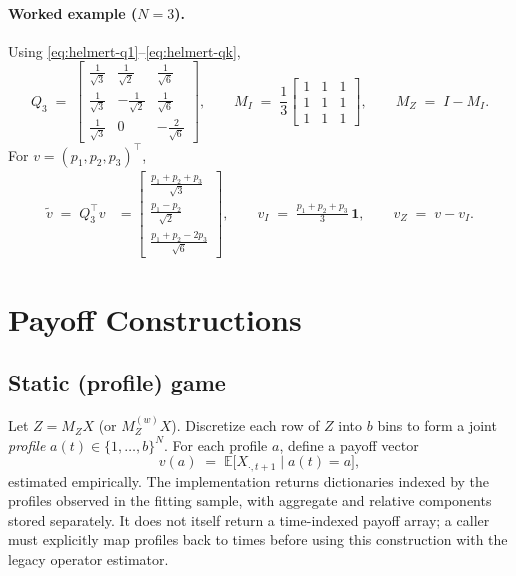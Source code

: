 \documentclass[11pt]{article}
\newcommand{\one}{\mathbf{1}}
\newcommand{\E}{\mathbb{E}}
\begin{document}
\paragraph{Worked example ($N=3$).}
Using \eqref{eq:helmert-q1}–\eqref{eq:helmert-qk},
\begin{equation}
Q_3 \;=\;
\begin{bmatrix}
\frac{1}{\sqrt{3}} & \frac{1}{\sqrt{2}} & \frac{1}{\sqrt{6}} \\[5pt]
\frac{1}{\sqrt{3}} & -\frac{1}{\sqrt{2}} & \frac{1}{\sqrt{6}} \\[5pt]
\frac{1}{\sqrt{3}} & 0 & -\frac{2}{\sqrt{6}}
\end{bmatrix},\qquad
M_I \;=\; \frac{1}{3}
\begin{bmatrix}
1 & 1 & 1 \\ 1 & 1 & 1 \\ 1 & 1 & 1
\end{bmatrix},\qquad
M_Z \;=\; I - M_I.
\end{equation}
For $v=(p_1,p_2,p_3)^\top$,
\begin{align}
\tilde v \;=\; Q_3^\top v
&= \begin{bmatrix}
\frac{p_1+p_2+p_3}{\sqrt{3}}\\[3pt]
\frac{p_1-p_2}{\sqrt{2}}\\[3pt]
\frac{p_1+p_2-2p_3}{\sqrt{6}}
\end{bmatrix},\qquad
v_I \;=\; \frac{p_1+p_2+p_3}{3}\,\one,\qquad
v_Z \;=\; v - v_I.
\end{align}

\section{Payoff Constructions}
\subsection{Static (profile) game}
Let $Z=M_Z X$ (or $M_Z^{(w)}X$). Discretize each row of $Z$ into $b$ bins to form a joint \emph{profile} $a(t)\in\{1,\dots,b\}^N$. For each profile $a$, define a payoff vector
\begin{equation}
v(a) \;=\; \E\!\big[X_{\cdot,t+1}\mid a(t)=a\big],
\end{equation}
estimated empirically. The implementation returns dictionaries indexed by the
profiles observed in the fitting sample, with aggregate and relative components
stored separately. It does not itself return a time-indexed payoff array; a
caller must explicitly map profiles back to times before using this construction
with the legacy operator estimator.
\end{document}
